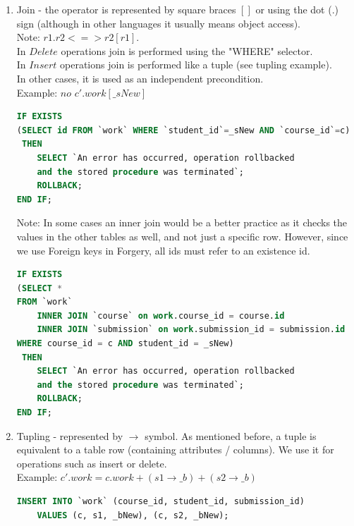 \documentclass[oneside]{book}
\begin{document}
\begin{enumerate}
\item Join - the operator is represented by square braces $[]$ or using the dot ($.$) sign (although in other languages it usually means object access).\\
Note: $r1.r2 <=> r2 [r1]$.\\
In $Delete$ operations join is performed using the "WHERE" selector.\\
In $Insert$ operations join is performed like a tuple (see tupling example).\\
In other cases, it is used as an independent precondition.\\
Example: $no$ $c'.work [\_sNew]$
\begin{lstlisting}[escapechar=@,language=SQL]
IF EXISTS
(SELECT id FROM `work` WHERE `student_id`=_sNew AND `course_id`=c)
 THEN
	SELECT `An error has occurred, operation rollbacked 
	and the stored procedure was terminated`;
	ROLLBACK;
END IF;
\end{lstlisting}

Note: In some cases an inner join would be a better practice as it checks the values in the other tables as well, and not just a specific row. However, since we use Foreign keys in Forgery, all ids must refer to an existence id. 

\begin{lstlisting}[escapechar=@,language=SQL]
IF EXISTS
(SELECT *
FROM `work`
	INNER JOIN `course` on work.course_id = course.id
	INNER JOIN `submission` on work.submission_id = submission.id
WHERE course_id = c AND student_id = _sNew)
 THEN
	SELECT `An error has occurred, operation rollbacked 
	and the stored procedure was terminated`;
	ROLLBACK;
END IF;
\end{lstlisting}

\item Tupling - represented by $\rightarrow$ symbol. As mentioned before, a tuple is equivalent to a table row (containing attributes / columns). We use it for operations such as insert or delete. \\
Example: $c'.work = c.work + (s1 \rightarrow \_b) + (s2 \rightarrow \_b)$

\begin{lstlisting}[escapechar=@,language=SQL]
INSERT INTO `work` (course_id, student_id, submission_id) 
	VALUES (c, s1, _bNew), (c, s2, _bNew);
\end{lstlisting}

\end{enumerate}
\end{document}
